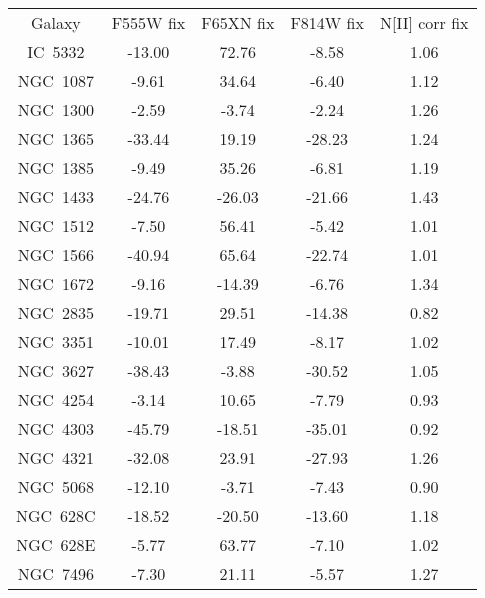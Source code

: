 \begin{table}
\begin{tabular}{ccccc}
Galaxy & F555W fix & F65XN fix & F814W fix & N[II] corr fix \\
IC~5332 & -13.00 & 72.76 & -8.58 & 1.06 \\
NGC~1087 & -9.61 & 34.64 & -6.40 & 1.12 \\
NGC~1300 & -2.59 & -3.74 & -2.24 & 1.26 \\
NGC~1365 & -33.44 & 19.19 & -28.23 & 1.24 \\
NGC~1385 & -9.49 & 35.26 & -6.81 & 1.19 \\
NGC~1433 & -24.76 & -26.03 & -21.66 & 1.43 \\
NGC~1512 & -7.50 & 56.41 & -5.42 & 1.01 \\
NGC~1566 & -40.94 & 65.64 & -22.74 & 1.01 \\
NGC~1672 & -9.16 & -14.39 & -6.76 & 1.34 \\
NGC~2835 & -19.71 & 29.51 & -14.38 & 0.82 \\
NGC~3351 & -10.01 & 17.49 & -8.17 & 1.02 \\
NGC~3627 & -38.43 & -3.88 & -30.52 & 1.05 \\
NGC~4254 & -3.14 & 10.65 & -7.79 & 0.93 \\
NGC~4303 & -45.79 & -18.51 & -35.01 & 0.92 \\
NGC~4321 & -32.08 & 23.91 & -27.93 & 1.26 \\
NGC~5068 & -12.10 & -3.71 & -7.43 & 0.90 \\
NGC~628C & -18.52 & -20.50 & -13.60 & 1.18 \\
NGC~628E & -5.77 & 63.77 & -7.10 & 1.02 \\
NGC~7496 & -7.30 & 21.11 & -5.57 & 1.27 \\
\end{tabular}
\end{table}
